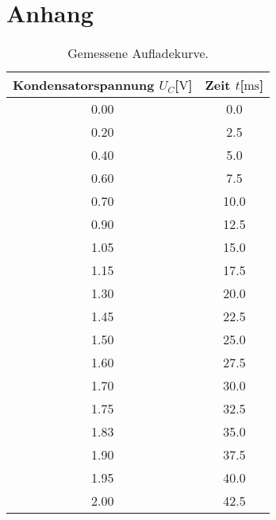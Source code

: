 \section{Anhang}

\begin{table}
    \centering
    \caption{Gemessene Aufladekurve.}
    \label{tab:aufladen}
    \begin{tabular}{c c}
        \toprule
        Kondensatorspannung $U_{C}$[$\si{\volt}$] & Zeit $t$[$\si{\milli\second}$] \\
        \midrule
        0.00     &     0.0\\
        0.20     &    2.5\\
        0.40     &    5.0\\
        0.60     &    7.5\\
        0.70     &    10.0\\
        0.90     &    12.5\\
        1.05     &   15.0\\
        1.15     &   17.5\\   
        1.30     &    20.0\\
        1.45     &   22.5\\  
        1.50     &    25.0\\
        1.60     &    27.5\\
        1.70     &    30.0\\
        1.75     &   32.5\\  
        1.83     &  35.0\\
        1.90     &    37.5\\
        1.95     &   40.0\\
        2.00     &      42.5\\
        \bottomrule
    \end{tabular}
    \end{table}

